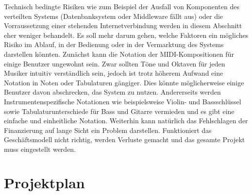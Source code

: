 \documentclass[12pt]{scrartcl}
\begin{document}

Technisch bedingte Risiken wie zum Beispiel der Ausfall von Komponenten des verteilten Systems (Datenbanksystem oder Middleware fällt aus) oder die Vorraussetzung einer stehenden Internetverbindung werden in diesem Abschnitt eher weniger behandelt. Es soll mehr darum gehen, welche Faktoren ein mögliches Risiko im Ablauf, in der Bedienung oder in der Vermarktung des Systems darstellen könnten.
Zunächst kann die Notation der MIDI-Kompositionen für einige Benutzer ungewohnt sein. Zwar sollten Töne und Oktaven für jeden Musiker intuitiv verständlich sein, jedoch ist trotz höherem Aufwand eine Notation in Noten oder Tabulaturen gängiger. Dies könnte möglicherweise einige Benutzer davon abschrecken, das System zu nutzen. Andererseits werden Instrumentenspezifische Notationen wie beispielsweise Violin- und Bassschlüssel sowie Tabulaturunterschiede für Bass und Gitarre vermieden und es gibt eine einfache und einheitliche Notation.
Weiterhin kann natürlich das Fehlschlagen der Finanzierung auf lange Sicht ein Problem darstellen. Funktioniert das Geschäftsmodell nicht richtig, werden Verluste gemacht und das gesamte Projekt muss eingestellt werden.



\section{Projektplan}



\end{document}
